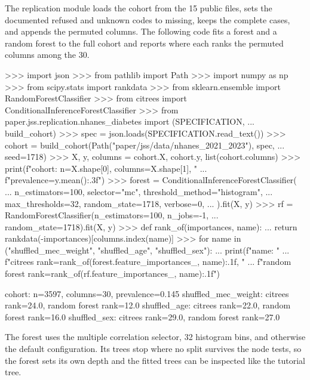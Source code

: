 \documentclass[article]{jss}
\newcommand{\citrees}{\pkg{citrees}\xspace}
\newcommand{\sklearn}{\pkg{scikit-learn}\xspace}
\begin{document}
The replication module loads the cohort from the 15 public files, sets the
documented refused and unknown codes to missing, keeps the complete cases, and
appends the permuted columns. The following code fits a \citrees forest and a
\sklearn random forest to the full cohort and reports where each ranks the
permuted columns among the 30.
%
\begin{CodeChunk}
\begin{CodeInput}
>>> import json
>>> from pathlib import Path
>>> import numpy as np
>>> from scipy.stats import rankdata
>>> from sklearn.ensemble import RandomForestClassifier
>>> from citrees import ConditionalInferenceForestClassifier
>>> from paper.jss.replication.nhanes_diabetes import (SPECIFICATION,
...                                                     build_cohort)
>>> spec = json.loads(SPECIFICATION.read_text())
>>> cohort = build_cohort(Path("paper/jss/data/nhanes_2021_2023"), spec,
...                       seed=1718)
>>> X, y, columns = cohort.X, cohort.y, list(cohort.columns)
>>> print(f"cohort: n={X.shape[0]}, columns={X.shape[1]}, "
...       f"prevalence={y.mean():.3f}")
>>> forest = ConditionalInferenceForestClassifier(
...     n_estimators=100, selector="mc", threshold_method="histogram",
...     max_thresholds=32, random_state=1718, verbose=0,
... ).fit(X, y)
>>> rf = RandomForestClassifier(n_estimators=100, n_jobs=-1,
...                             random_state=1718).fit(X, y)
>>> def rank_of(importances, name):
...     return rankdata(-importances)[columns.index(name)]
>>> for name in ("shuffled_mec_weight", "shuffled_age", "shuffled_sex"):
...     print(f"{name}: "
...           f"citrees rank={rank_of(forest.feature_importances_, name):.1f}, "
...           f"random forest rank={rank_of(rf.feature_importances_, name):.1f}")
\end{CodeInput}
\begin{CodeOutput}
cohort: n=3597, columns=30, prevalence=0.145
shuffled_mec_weight: citrees rank=24.0, random forest rank=12.0
shuffled_age: citrees rank=22.0, random forest rank=16.0
shuffled_sex: citrees rank=29.0, random forest rank=27.0
\end{CodeOutput}
\end{CodeChunk}
%
The \citrees forest uses the multiple correlation selector, 32 histogram bins,
and otherwise the default configuration. Its trees stop where no split
survives the node tests, so the forest sets its own depth and the fitted
trees can be inspected like the tutorial tree.
%
\end{document}
